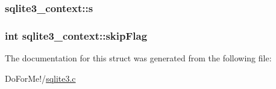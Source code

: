 \hypertarget{structsqlite3__context_a53d44518a1f7f57ce5a2d73b6e8d2c14}{
\subsubsection[{s}]{ sqlite3\-\_\-context\-::s}}\label{structsqlite3__context_a53d44518a1f7f57ce5a2d73b6e8d2c14}
\hypertarget{structsqlite3__context_aaee18da17fe31959469aa1ca9b9e1406}{
\subsubsection[{skip\-Flag}]{\setlength{\rightskip}{0pt plus 5cm}int sqlite3\-\_\-context\-::skip\-Flag}}\label{structsqlite3__context_aaee18da17fe31959469aa1ca9b9e1406}


The documentation for this struct was generated from the following file\-:\begin{DoxyCompactItemize}
\item 
Do\-For\-Me!/\hyperlink{sqlite3_8c}{sqlite3.\-c}\end{DoxyCompactItemize}
